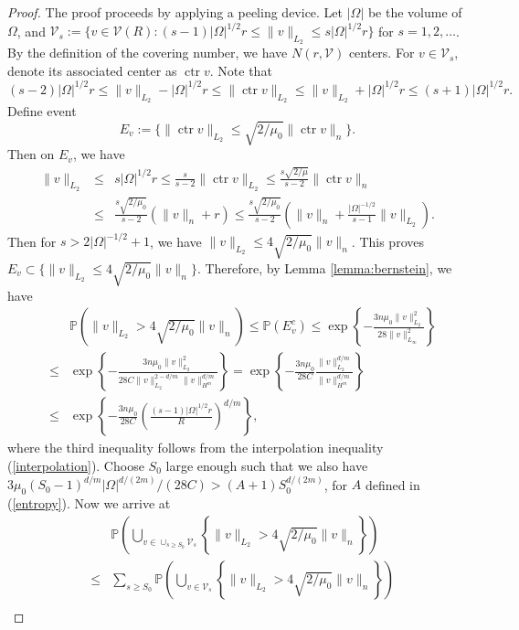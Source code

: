 \documentclass[12pt]{article}
\theoremstyle{plain}
\theoremstyle{remark}
\begin{document}
\begin{proof}
    The proof proceeds by applying a peeling device.
    Let $|\Omega|$ be the volume of $\Omega$, and $\mathcal{V}_s:=\{v\in\mathcal{V}(R):(s-1)|\Omega|^{1/2}r \leq \|v\|_{L_2}\leq s |\Omega|^{1/2}r\}$ for $s=1,2,\ldots$. By the definition of the covering number, we have $N(r,\mathcal{V})$ centers. For $v\in\mathcal{V}_s$, denote its associated center as $\operatorname{ctr}v$. Note that
    \[(s-2)|\Omega|^{1/2}r\leq\|v\|_{L_2}-|\Omega|^{1/2}r\leq \|\operatorname{ctr}v\|_{L_2}\leq\|v\|_{L_2}+|\Omega|^{1/2}r\leq (s+1)|\Omega|^{1/2}r.\] Define event
    \[E_v:=\{\|\operatorname{ctr}v\|_{L_2}\leq \sqrt{2/\mu_0}\|\operatorname{ctr}v\|_n\}.\]
    Then on $E_v$, we have 
    \begin{eqnarray*}
        \|v\|_{L_2}&\leq& s|\Omega|^{1/2}r\leq \frac{s}{s-2}\|\operatorname{ctr}v\|_{L_2}\leq \frac{s\sqrt{2/\mu}}{s-2}\|\operatorname{ctr}v\|_n\\
        &\leq&\frac{s\sqrt{2/\mu_0}}{s-2}(\|v\|_n+r)\leq \frac{s\sqrt{2/\mu_0}}{s-2}\left(\|v\|_n+\frac{|\Omega|^{-1/2}}{s-1}\|v\|_{L_2}\right).
    \end{eqnarray*}
    Then for $s> 2|\Omega|^{-1/2}+1$, we have $\|v\|_{L_2}\leq 4\sqrt{2/\mu_0}\|v\|_n$. This proves $E_v\subset \{\|v\|_{L_2}\leq 4\sqrt{2/\mu_0}\|v\|_n\}$. Therefore, by Lemma \ref{lemma:bernstein}, we have
    \begin{eqnarray*}
    &&\mathbb{P}(\|v\|_{L_2}> 4\sqrt{2/\mu_0}\|v\|_n)\leq \mathbb{P}(E_v^c)\leq \exp\left\{-\frac{3n\mu_0\|v\|^2_{L_2}}{28\|v\|^2_{L_\infty}}\right\}\\
    &\leq&\exp\left\{-\frac{3n\mu_0\|v\|^2_{L_2}}{28C\|v\|^{2-d/m}_{L_2}\|v\|^{d/m}_{H^m}}\right\}=\exp\left\{-\frac{3n\mu_0}{28C}\frac{\|v\|^{d/m}_{L_2}}{\|v\|^{d/m}_{H^m}}\right\}\\
    &\leq&\exp\left\{-\frac{3n\mu_0}{28C}\left(\frac{(s-1)|\Omega|^{1/2}r}{R}\right)^{d/m}\right\},
    \end{eqnarray*}
    where the third inequality follows from the interpolation inequality (\ref{interpolation}). Choose $S_0$ large enough such that we also have $3\mu_0(S_0-1)^{d/m}|\Omega|^{d/(2m)}/(28C)>(A+1)S_0^{d/(2m)}$, for $A$ defined in (\ref{entropy}). Now we arrive at
    \begin{eqnarray*}
        &&\mathbb{P}\left(\bigcup_{v\in \cup_{s\geq S_0}\mathcal{V}_s}\left\{\|v\|_{L_2}> 4\sqrt{2/\mu_0}\|v\|_n\right\}\right)\\
        &\leq&\sum_{s\geq S_0}\mathbb{P}\left(\bigcup_{v\in \mathcal{V}_s}\left\{\|v\|_{L_2}> 4\sqrt{2/\mu_0}\|v\|_n\right\}\right)\\

\end{eqnarray*}
\end{proof}
\end{document}
